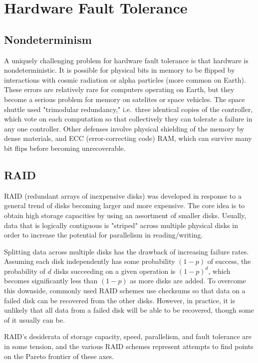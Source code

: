 \documentclass[twoside]{article}
\begin{document}
\section{Hardware Fault Tolerance}
\subsection{Nondeterminism}
A uniquely challenging problem for hardware fault tolerance is that hardware is nondeterministic.
It is possible for physical bits in memory to be flipped by interactions with cosmic radiation or alpha particles (more common on Earth).
These errors are relatively rare for computers operating on Earth, but they become a serious problem for memory on satelites or space vehicles.
The space shuttle used "trimodular redundancy," i.e.\ three identical copies of the controller, which vote on each computation so that collectively they can tolerate a failure in any one controller.
Other defenses involve physical shielding of the memory by dense materials, and ECC (error-correcting code) RAM, which can survive many bit flips before becoming unrecoverable.

\subsection{RAID}
RAID (redundant arrays of inexpensive disks) was developed in response to a general trend of disks becoming larger and more expensive.
The core idea is to obtain high storage capacities by using an assortment of smaller disks.
Usually, data that is logically contiguous is "striped" across multiple physical disks in order to increase the potential for parallelism in reading/writing.

Splitting data across multiple disks has the drawback of increasing failure rates.
Assuming each disk independently has some probability $(1-p)$ of success, the probability of $d$ disks succeeding on a given operation is $(1-p)^d$, which becomes significantly less than $(1-p)$ as more disks are added.
To overcome this downside, commonly used RAID schemes use checksums so that data on a failed disk can be recovered from the other disks.
However, in practice, it is unlikely that all data from a failed disk will be able to be recovered, though some of it usually can be.

RAID's desiderata of storage capacity, speed, parallelism, and fault tolerance are in some tension, and the various RAID schemes represent attempts to find points on the Pareto frontier of these axes.
\end{document}
